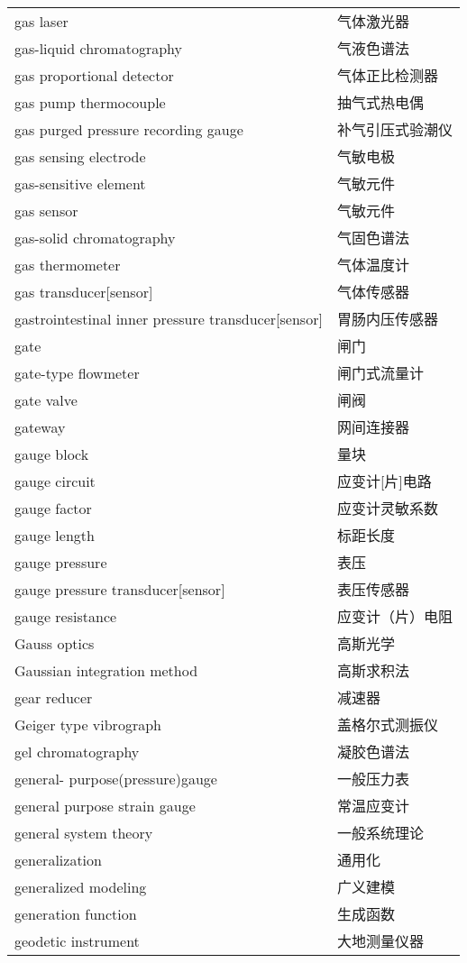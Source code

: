 \documentclass[
]{article}
\begin{document}
\begin{longtable}[]{@{}ll@{}}
gas laser & 气体激光器 \\
gas-liquid chromatography & 气液色谱法 \\
gas proportional detector & 气体正比检测器 \\
gas pump thermocouple & 抽气式热电偶 \\
gas purged pressure recording gauge & 补气引压式验潮仪 \\
gas sensing electrode & 气敏电极 \\
gas-sensitive element & 气敏元件 \\
gas sensor & 气敏元件 \\
gas-solid chromatography & 气固色谱法 \\
gas thermometer & 气体温度计 \\
gas transducer{[}sensor{]} & 气体传感器 \\
gastrointestinal inner pressure transducer{[}sensor{]} &
胃肠内压传感器 \\
gate & 闸门 \\
gate-type flowmeter & 闸门式流量计 \\
gate valve & 闸阀 \\
gateway & 网间连接器 \\
gauge block & 量块 \\
gauge circuit & 应变计{[}片{]}电路 \\
gauge factor & 应变计灵敏系数 \\
gauge length & 标距长度 \\
gauge pressure & 表压 \\
gauge pressure transducer{[}sensor{]} & 表压传感器 \\
gauge resistance & 应变计（片）电阻 \\
Gauss optics & 高斯光学 \\
Gaussian integration method & 高斯求积法 \\
gear reducer & 减速器 \\
Geiger type vibrograph & 盖格尔式测振仪 \\
gel chromatography & 凝胶色谱法 \\
general- purpose(pressure)gauge & 一般压力表 \\
general purpose strain gauge & 常温应变计 \\
general system theory & 一般系统理论 \\
generalization & 通用化 \\
generalized modeling & 广义建模 \\
generation function & 生成函数 \\
geodetic instrument & 大地测量仪器 \\

\end{longtable}
\end{document}
